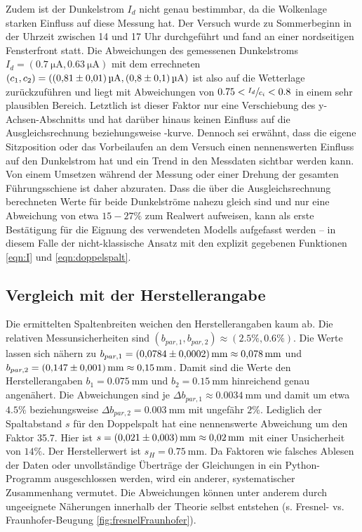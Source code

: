 Zudem ist der Dunkelstrom $I_d$ nicht genau bestimmbar, da die Wolkenlage starken Einfluss auf diese Messung hat. Der Versuch wurde zu Sommerbeginn in der Uhrzeit zwischen
14 und 17 Uhr durchgeführt und fand an einer nordseitigen Fensterfront statt.
Die Abweichungen des gemessenen Dunkelstroms $I_d = (\SI{0.7}{\micro\ampere}, \SI{0.63}{\micro\ampere}) $ mit dem errechneten $(c_1, c_2) = (\SI{0.81\pm0.01}{\micro\ampere}, \SI{0.8\pm0.1}{\micro\ampere})$
ist also auf die Wetterlage zurückzuführen und liegt mit Abweichungen von $0.75 < \sfrac{I_d}{c_i} < 0.8$ in einem sehr plausiblen Bereich.
Letztlich ist dieser Faktor nur eine Verschiebung des y-Achsen-Abschnitts und hat darüber hinaus keinen Einfluss auf die Ausgleichsrechnung beziehungsweise -kurve.
Dennoch sei erwähnt, dass die eigene Sitzposition oder das Vorbeilaufen an dem Versuch einen nennenswerten Einfluss auf den Dunkelstrom hat und ein Trend in den Messdaten sichtbar werden kann.
Von einem Umsetzen während der Messung oder einer Drehung der gesamten Führungsschiene ist daher abzuraten.
Dass die über die Ausgleichsrechnung berechneten Werte für beide Dunkelströme nahezu gleich sind und nur eine Abweichung von etwa $15-27\%$ zum Realwert aufweisen, kann als erste Bestätigung für die Eignung des verwendeten Modells aufgefasst werden -- in diesem Falle der
nicht-klassische Ansatz mit den explizit gegebenen Funktionen \eqref{eqn:I} und \eqref{eqn:doppelspalt}.

\subsection{Vergleich mit der Herstellerangabe}
Die ermittelten Spaltenbreiten weichen den Herstellerangaben kaum ab. Die relativen Messunsicherheiten sind
$(b_{par, 1}, b_{par, 2}) \approx (2.5\%, 0.6\%)$. Die Werte lassen sich nähern zu $b_{par, 1} = \SI{0.0784 \pm 0.0002}{\milli\meter} \approx \SI{0.078}{\milli\meter}$ und
$b_{par, 2} = \SI{0.147 \pm 0.001}{\milli\meter} \approx \SI{0.15}{\milli\meter}$.
Damit sind die Werte den Herstellerangaben $b_{1} = \SI{0.075}{\milli\meter}$ und $b_2 = \SI{0.15}{\milli\meter}$ hinreichend genau angenähert. Die Abweichungen sind je $\Delta b_{par, 1} \approx \SI{0.0034}{\milli\meter}$ und damit um etwa $4.5\%$ beziehungsweise $\Delta b_{par, 2} = \SI{0.003}{\milli\meter}$ mit ungefähr $2\%$.
Lediglich der Spaltabstand $s$ für den Doppelspalt hat eine nennenswerte Abweichung um den Faktor 35.7. Hier ist $s = \SI{0.021 \pm 0.003}{\milli\meter} \approx \SI{0.02}{\milli\meter}$ mit einer Unsicherheit von
$14\%$. Der Herstellerwert ist $s_H = \SI{0.75}{\milli\meter}$.
Da Faktoren wie falsches Ablesen der Daten oder unvollständige Überträge der Gleichungen in ein Python-Programm ausgeschlossen werden,
wird ein anderer, systematischer Zusammenhang vermutet.
Die Abweichungen können unter anderem durch ungeeignete Näherungen innerhalb der Theorie selbst entstehen (s. Fresnel- vs. Fraunhofer-Beugung \ref{fig:fresnelFraunhofer}). \\

